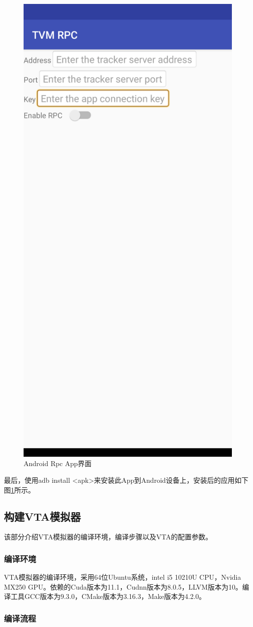\begin{figure}[h!]
    \centering
    \includegraphics[width=180.bp]{figure/android_app.png}
    \caption{Android Rpc App界面}
    \label{android_rpc_app}
\end{figure}

最后，使用adb install <apk>来安装此App到Android设备上，安装后的应用如下图\ref{android_rpc_app}所示。


\subsection{构建VTA模拟器}
该部分介绍VTA模拟器的编译环境，编译步骤以及VTA的配置参数。

\subsubsection{编译环境}

VTA模拟器的编译环境，采用64位Ubuntu系统，intel i5 10210U CPU，Nvidia MX250 GPU。依赖的Cuda版本为11.1，Cudnn版本为8.0.5，LLVM版本为10。编译工具GCC版本为9.3.0，CMake版本为3.16.3，Make版本为4.2.0。

\subsubsection{编译流程}


